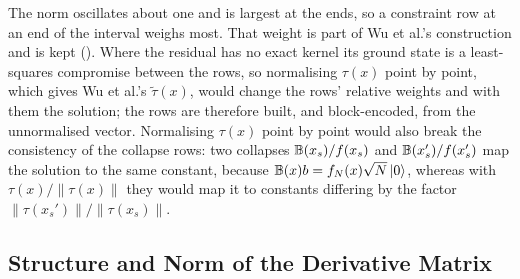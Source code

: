 The norm oscillates about one and is largest at the ends, so a constraint row at an end of the interval weighs most. That weight is part of Wu et al.'s construction and is kept (). Where the residual has no exact kernel its ground state is a least-squares compromise between the rows, so normalising $\tau(x)$ point by point, which gives Wu et al.'s $\tilde\tau(x)$, would change the rows' relative weights and with them the solution; the rows are therefore built, and block-encoded, from the unnormalised vector. Normalising $\tau(x)$ point by point would also break the consistency of the collapse rows: two collapses $\mathbb{B}(x_s)/f(x_s)$ and $\mathbb{B}(x_s')/f(x_s')$ map the solution to the same constant, because $\mathbb{B}(x)b=f_N(x)\sqrt N\ket0$, whereas with $\tau(x)/\|\tau(x)\|$ they would map it to constants differing by the factor $\|\tau(x_s')\|/\|\tau(x_s)\|$.

\subsection{Structure and Norm of the Derivative Matrix}
\label{app:cheb-G-norm}

